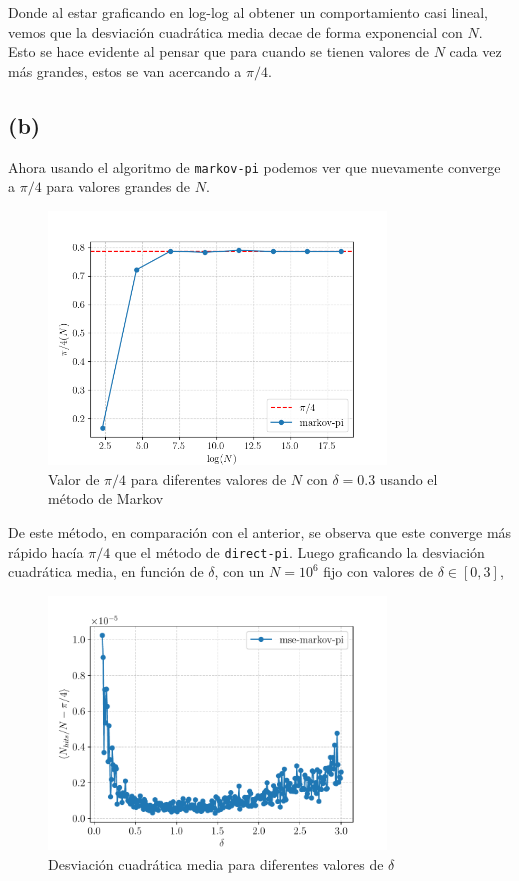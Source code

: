 \documentclass[11pt,a4paper]{article}
\begin{document}
Donde al estar graficando en log-log al obtener un comportamiento casi lineal, vemos que la desviación cuadrática media decae de forma exponencial con $N$. 
Esto se hace evidente al pensar que para cuando se tienen valores de $N$ cada vez más grandes, estos se van acercando a $\pi/4$.
\subsection*{(b)}
Ahora usando el algoritmo de \texttt{markov-pi} podemos ver que nuevamente converge a $\pi/4$ para valores grandes de $N$.
\begin{figure}[H]
    \centering
    \includegraphics[width=0.8\textwidth]{p1/b/markov-pi.png}
    \caption{Valor de $\pi/4$ para diferentes valores de $N$ con $\delta = 0.3$ usando el método de Markov}
    \label{fig:p1_3}
\end{figure}
De este método, en comparación con el anterior, se observa que este converge más rápido hacía $\pi/4$ que el método de \texttt{direct-pi}.
Luego graficando la desviación cuadrática media, en función de $\delta $, con un $N = 10^{6}$ fijo con valores de $\delta \in [0,3]$,
\begin{figure}[H]
    \centering
    \includegraphics[width=0.8\textwidth]{p1/b/mse-markov.pdf}
    \caption{Desviación cuadrática media para diferentes valores de $\delta$}
    \label{fig:p1_4}
\end{figure}
\end{document}
